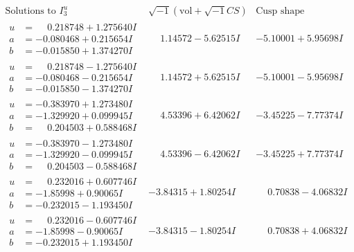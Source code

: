\documentclass[1p]{elsarticle_modified}
\theoremstyle{definition}
\newcommand{\I}{\sqrt{-1}}
\begin{document}
$$\begin{array}{c|c|c}  
\text{Solutions to }I^u_{3}& \I (\text{vol} + \sqrt{-1}CS) & \text{Cusp shape}\\
 \hline 
\begin{aligned}
u &= \phantom{-}0.218748 + 1.275640 I \\
a &= -0.080468 + 0.215654 I \\
b &= -0.015850 + 1.374270 I\end{aligned}
 & \phantom{-}1.14572 - 5.62515 I & -5.10001 + 5.95698 I \\ \hline\begin{aligned}
u &= \phantom{-}0.218748 - 1.275640 I \\
a &= -0.080468 - 0.215654 I \\
b &= -0.015850 - 1.374270 I\end{aligned}
 & \phantom{-}1.14572 + 5.62515 I & -5.10001 - 5.95698 I \\ \hline\begin{aligned}
u &= -0.383970 + 1.273480 I \\
a &= -1.329920 + 0.099945 I \\
b &= \phantom{-}0.204503 + 0.588468 I\end{aligned}
 & \phantom{-}4.53396 + 6.42062 I & -3.45225 - 7.77374 I \\ \hline\begin{aligned}
u &= -0.383970 - 1.273480 I \\
a &= -1.329920 - 0.099945 I \\
b &= \phantom{-}0.204503 - 0.588468 I\end{aligned}
 & \phantom{-}4.53396 - 6.42062 I & -3.45225 + 7.77374 I \\ \hline\begin{aligned}
u &= \phantom{-}0.232016 + 0.607746 I \\
a &= -1.85998 + 0.90065 I \\
b &= -0.232015 - 1.193450 I\end{aligned}
 & -3.84315 + 1.80254 I & \phantom{-}0.70838 - 4.06832 I \\ \hline\begin{aligned}
u &= \phantom{-}0.232016 - 0.607746 I \\
a &= -1.85998 - 0.90065 I \\
b &= -0.232015 + 1.193450 I\end{aligned}
 & -3.84315 - 1.80254 I & \phantom{-}0.70838 + 4.06832 I \\ \hline\begin{aligned}

\end{aligned}
\end{array}$$
\end{document}
